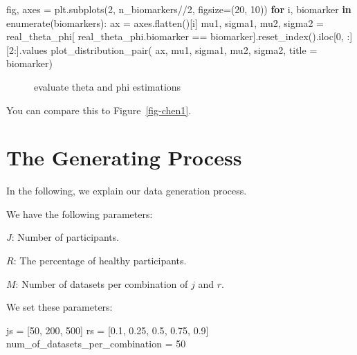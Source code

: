 \documentclass[
  letterpaper,
  DIV=11,
  numbers=noendperiod]{scrreprt}
\newenvironment{Shaded}{\begin{snugshade}}{\end{snugshade}}
\newcommand{\BuiltInTok}[1]{\textcolor[rgb]{0.00,0.23,0.31}{#1}}
\newcommand{\ControlFlowTok}[1]{\textcolor[rgb]{0.00,0.23,0.31}{\textbf{#1}}}
\newcommand{\DecValTok}[1]{\textcolor[rgb]{0.68,0.00,0.00}{#1}}
\newcommand{\FloatTok}[1]{\textcolor[rgb]{0.68,0.00,0.00}{#1}}
\newcommand{\KeywordTok}[1]{\textcolor[rgb]{0.00,0.23,0.31}{\textbf{#1}}}
\newcommand{\NormalTok}[1]{\textcolor[rgb]{0.00,0.23,0.31}{#1}}
\newcommand{\OperatorTok}[1]{\textcolor[rgb]{0.37,0.37,0.37}{#1}}
\begin{document}
\begin{Shaded}
\begin{Highlighting}[]
\NormalTok{fig, axes }\OperatorTok{=}\NormalTok{ plt.subplots(}\DecValTok{2}\NormalTok{, n\_biomarkers}\OperatorTok{//}\DecValTok{2}\NormalTok{, figsize}\OperatorTok{=}\NormalTok{(}\DecValTok{20}\NormalTok{, }\DecValTok{10}\NormalTok{))}
\ControlFlowTok{for}\NormalTok{ i, biomarker }\KeywordTok{in} \BuiltInTok{enumerate}\NormalTok{(biomarkers):}
\NormalTok{    ax }\OperatorTok{=}\NormalTok{ axes.flatten()[i] }
\NormalTok{    mu1, sigma1, mu2, sigma2 }\OperatorTok{=}\NormalTok{ real\_theta\_phi[}
\NormalTok{        real\_theta\_phi.biomarker }\OperatorTok{==}\NormalTok{ biomarker].reset\_index().iloc[}\DecValTok{0}\NormalTok{, :][}\DecValTok{2}\NormalTok{:].values}
\NormalTok{    plot\_distribution\_pair(}
\NormalTok{        ax, mu1, sigma1, mu2, sigma2, title }\OperatorTok{=}\NormalTok{ biomarker)}
\end{Highlighting}
\end{Shaded}

\begin{figure}[H]


\caption{\label{fig-eval-theta-phi-estimations}evaluate theta and phi
estimations}

\end{figure}%

You can compare this to Figure~\ref{fig-chen1}.

\section{The Generating Process}\label{the-generating-process}

In the following, we explain our data generation process.

We have the following parameters:

\(J\): Number of participants.

\(R\): The percentage of healthy participants.

\(M\): Number of datasets per combination of \(j\) and \(r\).

We set these parameters:

\begin{Shaded}
\begin{Highlighting}[]
\NormalTok{js }\OperatorTok{=}\NormalTok{ [}\DecValTok{50}\NormalTok{, }\DecValTok{200}\NormalTok{, }\DecValTok{500}\NormalTok{]}
\NormalTok{rs }\OperatorTok{=}\NormalTok{ [}\FloatTok{0.1}\NormalTok{, }\FloatTok{0.25}\NormalTok{, }\FloatTok{0.5}\NormalTok{, }\FloatTok{0.75}\NormalTok{, }\FloatTok{0.9}\NormalTok{]}
\NormalTok{num\_of\_datasets\_per\_combination }\OperatorTok{=} \DecValTok{50}
\end{Highlighting}
\end{Shaded}
\end{document}
